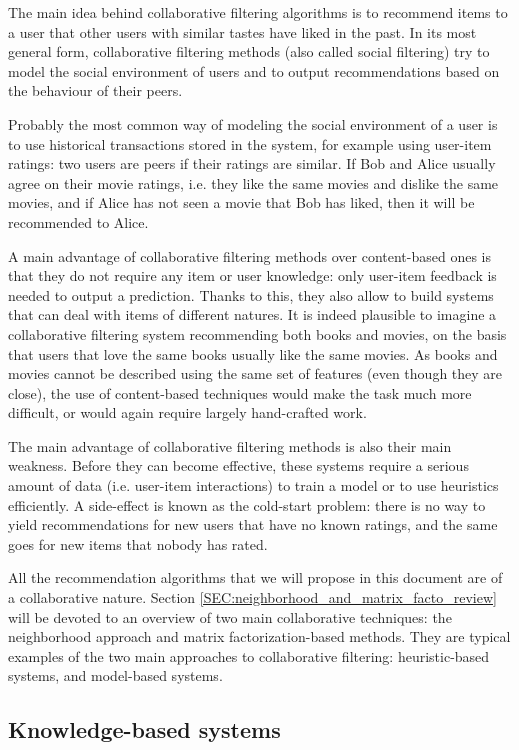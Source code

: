 The main idea behind collaborative filtering algorithms is to recommend items
to a user that other users with similar tastes have liked in the past. In its
most general form, collaborative filtering methods (also called social
filtering) try to model the social environment of users and to output
recommendations based on the behaviour of their peers.

Probably the most common way of modeling the social environment of a user is to
use historical transactions stored in the system, for example using user-item
ratings: two users are peers if their ratings are similar. If Bob and Alice
usually agree on their movie ratings, i.e. they like the same movies and
dislike the same movies, and if Alice has not seen a movie that Bob has liked,
then it will be recommended to Alice.

A main advantage of collaborative filtering methods over content-based ones is
that they do not require any item or user knowledge: only user-item feedback is
needed to output a prediction. Thanks to this, they also allow to build systems
that can deal with items of different natures. It is indeed plausible to
imagine a collaborative filtering system recommending both books and movies, on
the basis that users that love the same books usually like the same movies. As
books and movies cannot be described using the same set of features (even
though they are close), the use of content-based techniques would make the task
much more difficult, or would again require largely hand-crafted work.

The main advantage of collaborative filtering methods is also their main
weakness. Before they can become effective, these systems require a serious
amount of data (i.e. user-item interactions) to train a model or to use
heuristics efficiently. A side-effect is known as the cold-start problem: there
is no way to yield recommendations for new users that have no known ratings,
and the same goes for new items that nobody has rated.

All the recommendation algorithms that we will propose in this document are of
a collaborative nature. Section \ref{SEC:neighborhood_and_matrix_facto_review}
will be devoted to an overview of two main collaborative techniques: the
neighborhood approach and matrix factorization-based methods. They are
typical examples of the two main approaches to collaborative filtering:
heuristic-based systems, and model-based systems.

\subsection{Knowledge-based systems}

